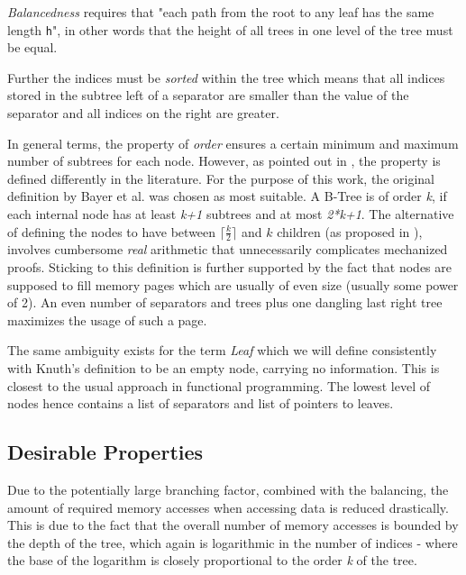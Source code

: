 \textit{Balancedness} requires that "each path from the root to any leaf has the same length \texttt{h}",
in other words that the height of all trees in one level of the tree must be equal.

Further the indices must be \textit{sorted} within the tree which means that all indices stored
in the subtree left of a separator are smaller than the value of the separator
and all indices on the right are greater.

In general terms, the property of \textit{order} ensures a certain minimum and maximum
number of subtrees for each node.
However, as pointed out in \parencite{DBLP:books/daglib/0095349_mod},
the property is defined differently in the literature.
For the purpose of this work, the original definition by Bayer et al. was chosen as most suitable.
A B-Tree is of order \textit{k}, if each internal node has at least \textit{k+1}
subtrees and at most \textit{2*k+1}.
The alternative of defining the nodes to have between $\lceil \frac{k}{2} \rceil$
and $k$ children (as proposed in \parencite{DBLP:books/lib/Knuth98a}),
involves cumbersome \textit{real} arithmetic that unnecessarily complicates
mechanized proofs.
Sticking to this definition is further supported by the fact that nodes are supposed
to fill memory pages which are usually of even size (usually some power of 2).
An even number of separators and trees plus one dangling last right tree maximizes
the usage of such a page.

The same ambiguity exists for the term \textit{Leaf} which we will define consistently with Knuth's definition \parencite{DBLP:books/lib/Knuth98a}
to be an empty node, carrying no information.
This is closest to the usual approach in functional programming.
The lowest level of nodes hence contains a list of separators and
list of pointers to leaves.


\subsection{Desirable Properties}

Due to the potentially large branching factor, combined with the balancing,
the amount of required memory accesses when accessing data is reduced drastically.
This is due to the fact that the overall number of memory accesses is bounded by the depth
of the tree, which again is logarithmic in the number of indices -
where the base of the logarithm is closely proportional to the order \textit{k} of the tree.

